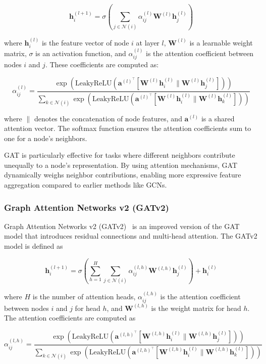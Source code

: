 \documentclass{article}
\begin{document}
$$
\mathbf{h}_i^{(l+1)} = \sigma \left( \sum_{j \in \mathcal{N}(i)} \alpha_{ij}^{(l)} \mathbf{W}^{(l)} \mathbf{h}_j^{(l)} \right)
$$

where $\mathbf{h}_i^{(l)}$ is the feature vector of node $i$ at layer $l$, $\mathbf{W}^{(l)}$ is a learnable weight matrix, $\sigma$ is an activation function, and $\alpha_{ij}^{(l)}$ is the attention coefficient between nodes $i$ and $j$. These coefficients are computed as:

$$
\alpha_{ij}^{(l)} = \frac{\exp \left( \text{LeakyReLU} \left( \mathbf{a}^{(l)^\top} [\mathbf{W}^{(l)} \mathbf{h}_i^{(l)} \| \mathbf{W}^{(l)} \mathbf{h}_j^{(l)}] \right) \right)}{\sum_{k \in \mathcal{N}(i)} \exp \left( \text{LeakyReLU} \left( \mathbf{a}^{(l)^\top} [\mathbf{W}^{(l)} \mathbf{h}_i^{(l)} \| \mathbf{W}^{(l)} \mathbf{h}_k^{(l)}] \right) \right)}
$$

where $\|$ denotes the concatenation of node features, and $\mathbf{a}^{(l)}$ is a shared attention vector. The softmax function ensures the attention coefficients sum to one for a node's neighbors.

GAT is particularly effective for tasks where different neighbors contribute unequally to a node's representation. By using attention mechanisms, GAT dynamically weighs neighbor contributions, enabling more expressive feature aggregation compared to earlier methods like GCNs.

\subsubsection{Graph Attention Networks v2 (GATv2)}
Graph Attention Networks v2 (GATv2)~\cite{brody2021attentive} is an improved version of the GAT model that introduces residual connections and multi-head attention. The GATv2 model is defined as

$$
    \mathbf{h}_i^{(l+1)} = \sigma \left( \sum_{h=1}^{H} \sum_{j \in \mathcal{N}(i)} \alpha_{ij}^{(l,h)} \mathbf{W}^{(l,h)} \mathbf{h}_j^{(l)} \right) + \mathbf{h}_i^{(l)}
$$

where $H$ is the number of attention heads, $\alpha_{ij}^{(l,h)}$ is the attention coefficient between nodes $i$ and $j$ for head $h$, and $\mathbf{W}^{(l,h)}$ is the weight matrix for head $h$. The attention coefficients are computed as

$$
    \alpha_{ij}^{(l,h)} = \frac{\exp \left( \text{LeakyReLU} \left( \mathbf{a}^{(l,h)^\top} [\mathbf{W}^{(l,h)} \mathbf{h}_i^{(l)} \| \mathbf{W}^{(l,h)} \mathbf{h}_j^{(l)}] \right) \right)}{\sum_{k \in \mathcal{N}(i)} \exp \left( \text{LeakyReLU} \left( \mathbf{a}^{(l,h)^\top} [\mathbf{W}^{(l,h)} \mathbf{h}_i^{(l)} \| \mathbf{W}^{(l,h)} \mathbf{h}_k^{(l)}] \right) \right)}
$$
\end{document}
